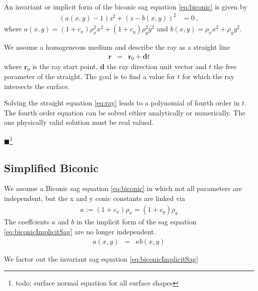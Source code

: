 \documentclass[12pt,a4paper,twoside,openright,BCOR10mm,headsepline,titlepage,abstracton,chapterprefix,final]{scrreprt}
\newcommand\Vector[1]{{\mathbf{#1}}}
\newcommand\Location{\Vector{r}}
\newcommand{\remark}[1]{{\color{red}$\blacksquare$}\footnote{{\color{red}#1}}}
\begin{document}
An invariant or implicit form of the biconic sag equation \eqref{eq:biconic} is given by
\begin{align}
 (a(x,y) - 1) z^2 + (z - b(x,y))^2 &= 0\,,\label{eq:biconicImplicitSag}
\end{align}
where $a(x,y) = (1 + c_x) \rho_x^2 x^2 + (1 + c_y) \rho_y^2 y^2$ and $b(x,y) = \rho_x x^2 + \rho_y y^2$. 

We assume a homogeneous medium and describe the ray as a straight line
\begin{eqnarray}
 \Location &=& \Location_0 + \Vector{d} t \label{eq:ray}
\end{eqnarray}
where $\Location_0$ is the ray start point, 
$\Vector{d}$ the ray direction unit vector and $t$ the free parameter of the straight.
The goal is to find a value for $t$ for which the ray intersects the surface.

Solving the straight equation \eqref{eq:ray} leads to a polynomial of fourth order in $t$.
The fourth order equation can be solved either analytically or numerically.
The one physically valid solution must be real valued.

\remark{todo: surface normal equation for all surface shapes}

\subsection{Simplified Biconic}
We assume a Biconic sag equation \eqref{eq:biconic} in which not all parameters are independent, but the x and y conic constants are linked via
\begin{eqnarray}
 \kappa := (1 + c_x) \rho_x = (1 + c_y) \rho_y
\end{eqnarray}
The coeffcients $a$ and $b$ in the implicit form of the sag equation \ref{eq:biconicImplicitSag} are no longer independent.
\begin{eqnarray}
 a(x,y) &=& \kappa b(x,y) 
\end{eqnarray}

We factor out the invariant sag equation \ref{eq:biconicImplicitSag}
\end{document}
